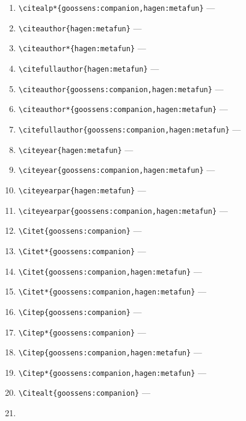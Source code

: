 \documentclass[12pt]{article}
\begin{document}
\begin{enumerate}
\item
\verb|\citealp*{goossens:companion,hagen:metafun}| ---
\citealp*{goossens:companion,hagen:metafun}
\item
\verb|\citeauthor{hagen:metafun}| ---
\citeauthor{hagen:metafun}
\item
\verb|\citeauthor*{hagen:metafun}| ---
\citeauthor*{hagen:metafun}
\item
\verb|\citefullauthor{hagen:metafun}| ---
\item
\verb|\citeauthor{goossens:companion,hagen:metafun}| ---
\citeauthor{goossens:companion,hagen:metafun}
\item
\verb|\citeauthor*{goossens:companion,hagen:metafun}| ---
\citeauthor*{goossens:companion,hagen:metafun}
\item
\verb|\citefullauthor{goossens:companion,hagen:metafun}| ---
\item
\verb|\citeyear{hagen:metafun}| ---
\citeyear{hagen:metafun}
\item
\verb|\citeyear{goossens:companion,hagen:metafun}| ---
\citeyear{goossens:companion,hagen:metafun}
\item
\verb|\citeyearpar{hagen:metafun}| ---
\citeyearpar{hagen:metafun}
\item
\verb|\citeyearpar{goossens:companion,hagen:metafun}| ---
\citeyearpar{goossens:companion,hagen:metafun}
\item
\verb|\Citet{goossens:companion}| ---
\item
\verb|\Citet*{goossens:companion}| ---
\item
\verb|\Citet{goossens:companion,hagen:metafun}| ---
\item
\verb|\Citet*{goossens:companion,hagen:metafun}| ---
\item
\verb|\Citep{goossens:companion}| ---
\item
\verb|\Citep*{goossens:companion}| ---
\item
\verb|\Citep{goossens:companion,hagen:metafun}| ---
\item
\verb|\Citep*{goossens:companion,hagen:metafun}| ---
\item
\verb|\Citealt{goossens:companion}| ---
\item

\end{enumerate}
\end{document}
